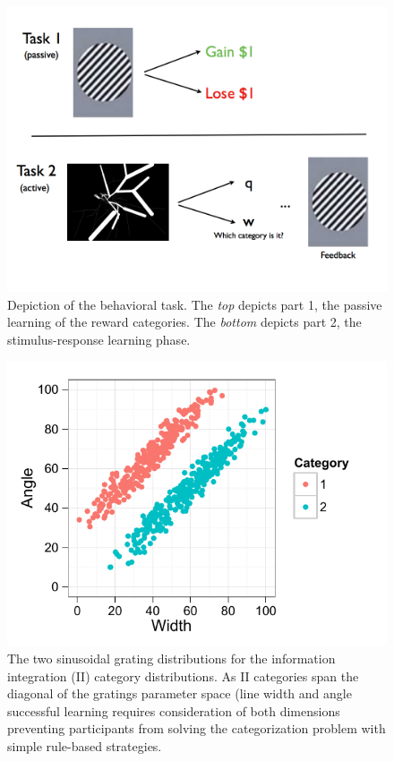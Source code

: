 \begin{figure}[tp]
    \noindent\includegraphics[width=39pc]{f_task}
    \centering
    \caption{Depiction of the behavioral task.  The \emph{top} depicts part 1, the passive learning of the reward categories.  The \emph{bottom} depicts part 2, the stimulus-response learning phase.}
    \label{fig:task}
\end{figure}

\begin{figure}[tp]
    \includegraphics{f_II}
    \centering
    \caption{The two sinusoidal grating distributions for the information integration (II) category distributions.   As II categories span the diagonal of the gratings parameter space (line width and angle successful learning requires consideration of both dimensions preventing participants from solving the categorization problem with simple rule-based strategies.}
    \label{fig:II}
\end{figure}

